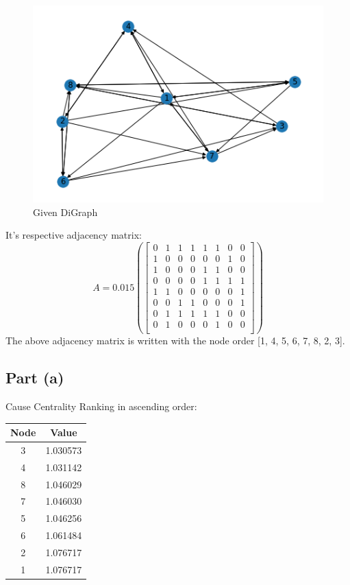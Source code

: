 \documentclass[conference]{IEEEtran}
\begin{document}
\begin{figure}[htbp]
\centerline{\includegraphics[scale=0.6]{img41.png}}
\caption{Given DiGraph}
\label{fig1}
\end{figure}

It's respective adjacency matrix:
\[
A = 0.015(
\begin{bmatrix}
    0 & 1 & 1 & 1 & 1 & 1 & 0 & 0\\
    1 & 0 & 0 & 0 & 0 & 0 & 1 & 0\\
    1 & 0 & 0 & 0 & 1 & 1 & 0 & 0\\
    0 & 0 & 0 & 0 & 1 & 1 & 1 & 1\\
    1 & 1 & 0 & 0 & 0 & 0 & 0 & 1\\
    0 & 0 & 1 & 1 & 0 & 0 & 0 & 1\\
    0 & 1 & 1 & 1 & 1 & 1 & 0 & 0\\
    0 & 1 & 0 & 0 & 0 & 1 & 0 & 0\\
\end{bmatrix})
\]
The above adjacency matrix is written with the node order [1, 4, 5, 6, 7, 8, 2, 3].

\subsection{Part (a)}
Cause Centrality Ranking in ascending order:

\begin{center}
 \begin{tabular}{||c c||} 
 \hline
 Node & Value \\ [0.5ex] 
 \hline\hline
 3 & 1.030573\\ 
 \hline
 4 & 1.031142\\
 \hline
 8 & 1.046029\\
 \hline
 7 & 1.046030\\
 \hline
 5 & 1.046256\\
 \hline
 6 & 1.061484\\
 \hline
 2 & 1.076717\\
 \hline
 1 & 1.076717\\ [1ex] 
 \hline
\end{tabular}
\end{center}
\end{document}
